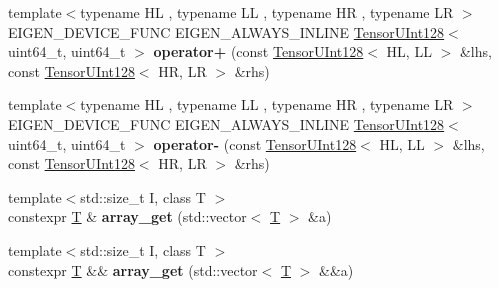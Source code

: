 \begin{DoxyCompactItemize}
\item 
\mbox{\label{namespace_eigen_1_1internal_a56a032f628e1b6aaf41d2507645d06d3}} 
{\footnotesize template$<$typename HL , typename LL , typename HR , typename LR $>$ }\\E\+I\+G\+E\+N\+\_\+\+D\+E\+V\+I\+C\+E\+\_\+\+F\+U\+NC E\+I\+G\+E\+N\+\_\+\+A\+L\+W\+A\+Y\+S\+\_\+\+I\+N\+L\+I\+NE \hyperlink{struct_eigen_1_1internal_1_1_tensor_u_int128}{Tensor\+U\+Int128}$<$ uint64\+\_\+t, uint64\+\_\+t $>$ {\bfseries operator+} (const \hyperlink{struct_eigen_1_1internal_1_1_tensor_u_int128}{Tensor\+U\+Int128}$<$ HL, LL $>$ \&lhs, const \hyperlink{struct_eigen_1_1internal_1_1_tensor_u_int128}{Tensor\+U\+Int128}$<$ HR, LR $>$ \&rhs)
\item 
\mbox{\label{namespace_eigen_1_1internal_ac97133b77c0ce88ad57cb0435e171b17}} 
{\footnotesize template$<$typename HL , typename LL , typename HR , typename LR $>$ }\\E\+I\+G\+E\+N\+\_\+\+D\+E\+V\+I\+C\+E\+\_\+\+F\+U\+NC E\+I\+G\+E\+N\+\_\+\+A\+L\+W\+A\+Y\+S\+\_\+\+I\+N\+L\+I\+NE \hyperlink{struct_eigen_1_1internal_1_1_tensor_u_int128}{Tensor\+U\+Int128}$<$ uint64\+\_\+t, uint64\+\_\+t $>$ {\bfseries operator-\/} (const \hyperlink{struct_eigen_1_1internal_1_1_tensor_u_int128}{Tensor\+U\+Int128}$<$ HL, LL $>$ \&lhs, const \hyperlink{struct_eigen_1_1internal_1_1_tensor_u_int128}{Tensor\+U\+Int128}$<$ HR, LR $>$ \&rhs)
\item 
\mbox{\label{namespace_eigen_1_1internal_a96526fe8b45046b9d18b39cb09bdf01a}} 
{\footnotesize template$<$std\+::size\+\_\+t I, class T $>$ }\\constexpr \hyperlink{group___sparse_core___module}{T} \& {\bfseries array\+\_\+get} (std\+::vector$<$ \hyperlink{group___sparse_core___module}{T} $>$ \&a)
\item 
\mbox{\label{namespace_eigen_1_1internal_a91e173764a65d6e11e06d6155c788eac}} 
{\footnotesize template$<$std\+::size\+\_\+t I, class T $>$ }\\constexpr \hyperlink{group___sparse_core___module}{T} \&\& {\bfseries array\+\_\+get} (std\+::vector$<$ \hyperlink{group___sparse_core___module}{T} $>$ \&\&a)
\item 
\mbox{\label{namespace_eigen_1_1internal_a8afa6b6124c02096db9a57b15bdfdf94}} 

\end{DoxyCompactItemize}
